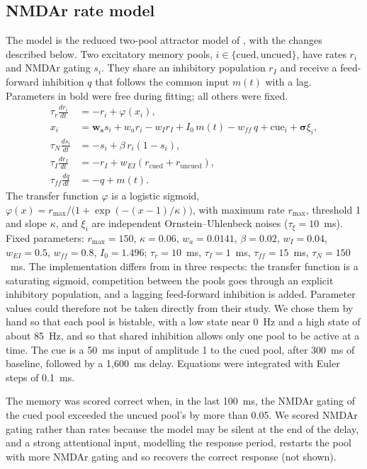 \documentclass[11pt]{article}
\newcommand{\cued}{\mathrm{cued}}
\newcommand{\uncued}{\mathrm{uncued}}
\begin{document}
\subsection{NMDAr rate model}

The model is the reduced two-pool attractor model of \citet{wong2006}, with the changes described below.
Two excitatory memory pools, $i \in \{\cued, \uncued\}$, have rates $r_i$ and NMDAr gating $s_i$.
They share an inhibitory population $r_I$ and receive a feed-forward inhibition $q$ that follows the common input $m(t)$ with a lag.
Parameters in bold were free during fitting; all others were fixed.
\begin{align}
  \tau_r \frac{dr_i}{dt} &= -r_i + \varphi(x_i), \\
  x_i &= \bm{w_s} s_i + w_a r_i - w_I r_I + I_0\, m(t) - w_{\mathit{ff}}\, q + \mathrm{cue}_i + \bm{\sigma} \xi_i, \\
  \tau_N \frac{ds_i}{dt} &= -s_i + \beta\, r_i (1 - s_i), \\
  \tau_I \frac{dr_I}{dt} &= -r_I + w_{EI} \left(r_\cued + r_\uncued\right), \\
  \tau_{\mathit{ff}} \frac{dq}{dt} &= -q + m(t).
\end{align}
The transfer function $\varphi$ is a logistic sigmoid, $\varphi(x) = r_{\max} / \bigl(1 + \exp(-(x - 1)/\kappa)\bigr)$, with maximum rate $r_{\max}$, threshold 1 and slope $\kappa$, and $\xi_i$ are independent Ornstein--Uhlenbeck noises ($\tau_\xi = 10$~ms).
Fixed parameters: $r_{\max} = 150$, $\kappa = 0.06$, $w_a = 0.0141$, $\beta = 0.02$, $w_I = 0.04$, $w_{EI} = 0.5$, $w_{\mathit{ff}} = 0.8$, $I_0 = 1.496$; $\tau_r = 10$~ms, $\tau_I = 1$~ms, $\tau_{\mathit{ff}} = 15$~ms, $\tau_N = 150$~ms.
The implementation differs from \citet{wong2006} in three respects: the transfer function is a saturating sigmoid, competition between the pools goes through an explicit inhibitory population, and a lagging feed-forward inhibition is added.
Parameter values could therefore not be taken directly from their study.
We chose them by hand so that each pool is bistable, with a low state near 0~Hz and a high state of about 85~Hz, and so that shared inhibition allows only one pool to be active at a time.
The cue is a 50~ms input of amplitude 1 to the cued pool, after 300~ms of baseline, followed by a 1,600~ms delay.
Equations were integrated with Euler steps of 0.1~ms.

The memory was scored correct when, in the last 100~ms, the NMDAr gating of the cued pool exceeded the uncued pool's by more than 0.05.
We scored NMDAr gating rather than rates because the model may be silent at the end of the delay, and a strong attentional input, modelling the response period, restarts the pool with more NMDAr gating and so recovers the correct response (not shown).
\end{document}
